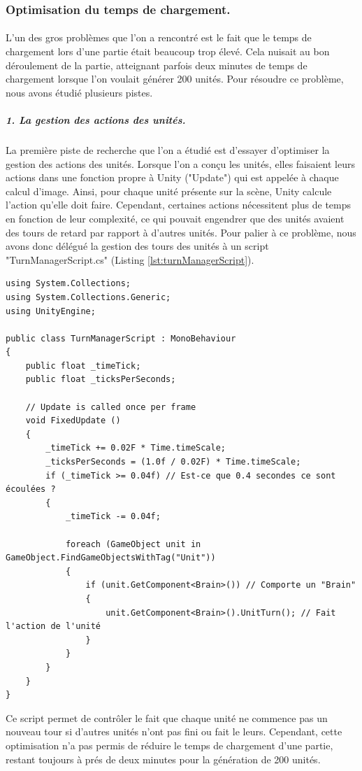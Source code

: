 \documentclass{report}
\begin{document}
\subsubsection{Optimisation du temps de chargement.}
\paragraph{} L'un des gros problèmes que l'on a rencontré est le fait que le temps de chargement lors d'une partie était beaucoup trop élevé. Cela nuisait au bon déroulement de la partie, atteignant parfois deux minutes de temps de chargement lorsque l'on voulait générer 200 unités. Pour résoudre ce problème, nous avons étudié plusieurs pistes.
\subparagraph{1. La gestion des actions des unités.}La première piste de recherche que l'on a étudié est d'essayer d'optimiser la gestion des actions des unités. Lorsque l'on a conçu les unités, elles faisaient leurs actions dans une fonction propre à Unity ("Update") qui est appelée à chaque calcul d'image. Ainsi, pour chaque unité présente sur la scène, Unity calcule l'action qu'elle doit faire. Cependant, certaines actions nécessitent plus de temps en fonction de leur complexité, ce qui pouvait engendrer que des unités avaient des tours de retard par rapport à d'autres unités. \newline
Pour palier à ce problème, nous avons donc délégué la gestion des tours des unités à un script  "TurnManagerScript.cs" (Listing \ref{lst:turnManagerScript}).\newline

 \begin{lstlisting}[language={[Sharp]C},label={lst:turnManagerScript}, caption= Code du script TurnManagerScript.cs]
using System.Collections;
using System.Collections.Generic;
using UnityEngine;

public class TurnManagerScript : MonoBehaviour
{
    public float _timeTick;
    public float _ticksPerSeconds;
    
    // Update is called once per frame
	void FixedUpdate ()
    {
        _timeTick += 0.02F * Time.timeScale;
        _ticksPerSeconds = (1.0f / 0.02F) * Time.timeScale;
        if (_timeTick >= 0.04f) // Est-ce que 0.4 secondes ce sont écoulées ?
        {
            _timeTick -= 0.04f;

            foreach (GameObject unit in GameObject.FindGameObjectsWithTag("Unit"))
            {
                if (unit.GetComponent<Brain>()) // Comporte un "Brain"
                {
                    unit.GetComponent<Brain>().UnitTurn(); // Fait l'action de l'unité
                }
            }
        }
	}
}
\end{lstlisting}
Ce script permet de contrôler le fait que chaque unité ne commence pas un nouveau tour si d'autres unités n'ont pas fini ou fait le leurs.
Cependant, cette optimisation n'a pas permis de réduire le temps de chargement d'une partie, restant toujours à prés de deux minutes pour la génération de 200 unités.
\end{document}
